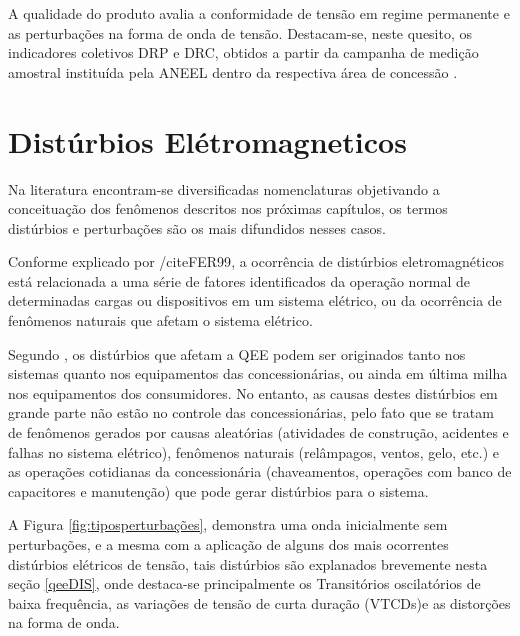 \par 
A qualidade do produto avalia a conformidade de tensão em regime permanente e as perturbações na forma de onda de tensão. Destacam-se, neste quesito, os indicadores coletivos DRP e DRC, obtidos a partir da campanha de medição amostral instituída pela ANEEL dentro da respectiva área de concessão \cite{ANEE2}.

\section{Distúrbios Elétromagneticos}\label{dis}
\par 
Na literatura encontram-se diversificadas nomenclaturas objetivando a conceituação dos fenômenos descritos nos próximas capítulos, os termos distúrbios e perturbações são os mais difundidos nesses casos. 
\par 
Conforme explicado por /cite{FER99}, a ocorrência de distúrbios eletromagnéticos está relacionada a uma série de fatores identificados da operação normal de determinadas cargas ou dispositivos em um sistema elétrico, ou da ocorrência de fenômenos naturais que afetam o sistema elétrico.
\par 
Segundo \cite{JUN09}, os distúrbios que afetam a QEE podem ser originados tanto nos sistemas quanto nos equipamentos das concessionárias, ou ainda em última milha nos equipamentos dos consumidores. No entanto, as causas destes distúrbios em grande parte não estão no controle das concessionárias, pelo fato que se tratam de fenômenos gerados por causas aleatórias  (atividades de construção, acidentes e falhas no sistema elétrico), fenômenos naturais (relâmpagos, ventos, gelo, etc.) e as operações cotidianas da concessionária (chaveamentos, operações com banco de capacitores e manutenção) que pode gerar distúrbios para o sistema.
\par 
A Figura \ref{fig:tiposperturbações}, demonstra uma onda inicialmente sem perturbações, e a mesma com a aplicação de alguns dos mais ocorrentes distúrbios elétricos de tensão, tais distúrbios são explanados brevemente nesta seção \ref{qeeDIS}, onde destaca-se principalmente os Transitórios oscilatórios de baixa frequência, as variações de tensão de curta duração (VTCDs)e as distorções na forma de onda.
